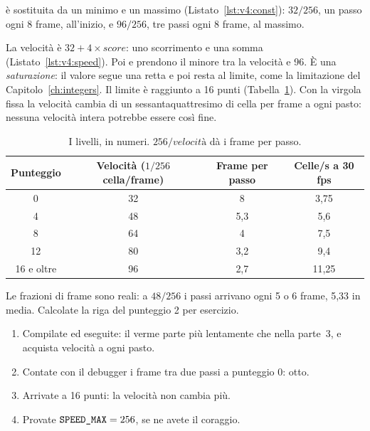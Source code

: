  è sostituita da un minimo e un massimo
(Listato~\ref{lst:v4:const}): $32/256$, un passo ogni 8 frame, all'inizio, e
$96/256$, tre passi ogni 8 frame, al massimo.


La velocità è $32+4\times\mathit{score}$: uno scorrimento e una somma
(Listato~\ref{lst:v4:speed}). Poi  e  prendono il minore tra
la velocità e 96. È una \emph{saturazione}: il valore segue una retta e poi
resta al limite, come la limitazione del Capitolo~\ref{ch:integers}. Il limite
è raggiunto a 16 punti (Tabella~\ref{tab:v4:levels}). Con la virgola fissa la
velocità cambia di un sessantaquattresimo di cella per frame a ogni pasto:
nessuna velocità intera potrebbe essere così fine.

\begin{table}[htb]
\centering\small
\caption{I livelli, in numeri. $256/\mathit{velocità}$ dà i frame per
passo.}\label{tab:v4:levels}
\begin{tabular}{@{}cccc@{}}
\toprule
\textbf{Punteggio} & \textbf{Velocità ($1/256$ cella/frame)} & \textbf{Frame per passo} & \textbf{Celle/s a 30 fps}\\
\midrule
0 & 32 & 8 & 3,75\\
4 & 48 & 5,3 & 5,6\\
8 & 64 & 4 & 7,5\\
12 & 80 & 3,2 & 9,4\\
16 e oltre & 96 & 2,7 & 11,25\\
\bottomrule
\end{tabular}
\end{table}

Le frazioni di frame sono reali: a $48/256$ i passi arrivano ogni 5 o 6 frame,
5,33 in media. Calcolate la riga del punteggio 2 per esercizio.

\begin{prgcheck}
\begin{enumerate}[nosep]
\item Compilate ed eseguite: il verme parte più lentamente che nella parte~3,
  e acquista velocità a ogni pasto.
\item Contate con il debugger i frame tra due passi a punteggio 0: otto.
\item Arrivate a 16 punti: la velocità non cambia più.
\item Provate $\texttt{SPEED\_MAX}=256$, se ne avete il coraggio.
\end{enumerate}
\end{prgcheck}

